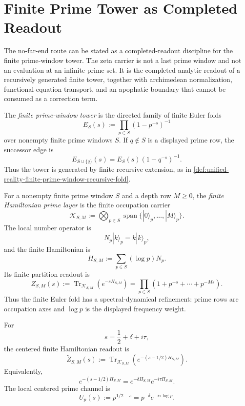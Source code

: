 \section{Finite Prime Tower as Completed Readout}
\label{sec:unified-reality-finite-prime-tower-completed-readout}

The no-far-end route can be stated as a completed-readout discipline for
the finite prime-window tower.  The zeta carrier is not a last prime
window and not an evaluation at an infinite prime set.  It is the
completed analytic readout of a recursively generated finite tower,
together with archimedean normalization, functional-equation transport,
and an apophatic boundary that cannot be consumed as a correction term.

\begin{definition}
\label{def:unified-reality-finite-prime-window-tower}
The \emph{finite prime-window tower} is the directed family of finite
Euler folds
$$
E_S(s):=\prod_{p\in S}(1-p^{-s})^{-1}
$$
over nonempty finite prime windows $S$.  If $q\notin S$ is a displayed
prime row, the successor edge is
$$
E_{S\cup\{q\}}(s)
=
E_S(s)(1-q^{-s})^{-1}.
$$
Thus the tower is generated by finite recursive extension, as in
\autoref{def:unified-reality-finite-prime-window-recursive-fold}.
\end{definition}

\begin{definition}
\label{def:unified-reality-finite-hamiltonian-prime-layer}
For a nonempty finite prime window $S$ and a depth row $M\ge0$, the
\emph{finite Hamiltonian prime layer} is the finite occupation carrier
$$
\mathcal K_{S,M}
:=
\bigotimes_{p\in S}
\operatorname{span}\{|0\rangle_p,\ldots,|M\rangle_p\}.
$$
The local number operator is
$$
N_p|k\rangle_p=k|k\rangle_p,
$$
and the finite Hamiltonian is
$$
H_{S,M}:=\sum_{p\in S}(\log p)N_p.
$$
Its finite partition readout is
$$
Z_{S,M}(s)
:=
\operatorname{Tr}_{\mathcal K_{S,M}}\left(e^{-sH_{S,M}}\right)
=
\prod_{p\in S}
\left(1+p^{-s}+\cdots+p^{-Ms}\right).
$$
Thus the finite Euler fold has a spectral-dynamical refinement: prime
rows are occupation axes and $\log p$ is the displayed frequency weight.
\end{definition}

\begin{definition}
\label{def:unified-reality-centered-finite-hamiltonian-readout}
For
$$
s=\frac12+\delta+i\tau,
$$
the centered finite Hamiltonian readout is
$$
\widetilde Z_{S,M}(s)
:=
\operatorname{Tr}_{\mathcal K_{S,M}}
\left(e^{-(s-1/2)H_{S,M}}\right).
$$
Equivalently,
$$
e^{-(s-1/2)H_{S,M}}
=
e^{-\delta H_{S,M}}e^{-i\tau H_{S,M}}.
$$
The local centered prime channel is
$$
U_p(s):=p^{1/2-s}=p^{-\delta}e^{-i\tau\log p}.
$$
\end{definition}

